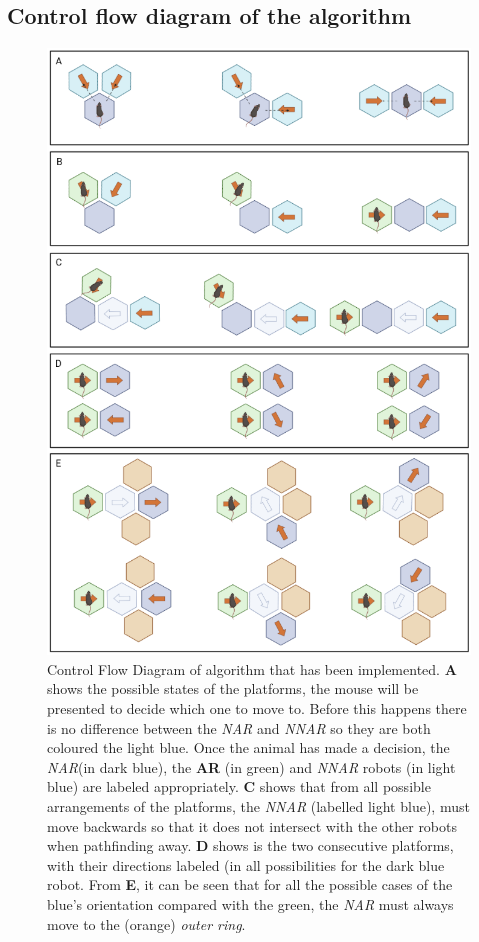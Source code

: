 \subsection{Control flow diagram of the algorithm}
\begin{figure}[H]
    \centering
    \includegraphics[scale = 1.4]{images/control_flow_diagram.png}
    \caption{Control Flow Diagram of algorithm that has been implemented. \textbf{A} shows the possible states of the platforms, the mouse will be presented to decide which one to move to. Before this happens there is no difference between the \textit{NAR} and \textit{NNAR} so they are both coloured the light blue. Once the animal has made a decision, the \textit{NAR}(in dark blue), the \textbf{AR} (in green) and \textit{NNAR} robots (in light blue) are labeled appropriately. \textbf{C} shows that from all possible arrangements of the platforms, the \textit{NNAR} (labelled light blue), must move backwards so that it does not intersect with the other robots when pathfinding away. \textbf{D} shows is the two consecutive platforms, with their directions labeled (in all possibilities for the dark blue robot. From \textbf{E}, it can be seen that for all the possible cases of the blue's orientation compared with the green, the \textit{NAR} must always move to the (orange) \textit{outer ring}.}
    \label{fig:control_flow_diagram}
\end{figure}

